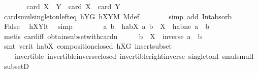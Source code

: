 \begin{isabellebody}
\ \ \ \ \isamarkupfalse%
\ \isamarkupfalse%
\ {\isachardoublequoteopen}card\ {\isacharparenleft}{\kern0pt}X\ {\isasymcdots}\ Y{\isacharparenright}{\kern0pt}\ {\isacharequal}{\kern0pt}\ card\ X\ {\isacharplus}{\kern0pt}\ card\ Y\ {\isacharminus}{\kern0pt}\ {}{\isachardoublequoteclose}\ \isamarkupfalse%
\ card{\isacharunderscore}{\kern0pt}smul{\isacharunderscore}{\kern0pt}singleton{\isacharunderscore}{\kern0pt}left{\isacharunderscore}{\kern0pt}eq\ hYG\ hXYM\ M{\isacharunderscore}{\kern0pt}def\isanewline
\ \ \ \ \ \ \isamarkupfalse%
\ {\isacharparenleft}{\kern0pt}simp\ add{\isacharcolon}{\kern0pt}\ Int{\isacharunderscore}{\kern0pt}absorb{}{\isacharparenright}{\kern0pt}\isanewline
\ \ \ \ \isamarkupfalse%
\ \isamarkupfalse%
\ False\ \isamarkupfalse%
\ hXYlt\ \isamarkupfalse%
\ simp\isanewline
\ \ \isamarkupfalse%
\isanewline
\ \ \isamarkupfalse%
\ \isamarkupfalse%
\ a\ b\ \ habX{\isacharcolon}{\kern0pt}\ {\isachardoublequoteopen}{\isacharbraceleft}{\kern0pt}a{\isacharcomma}{\kern0pt}\ b{\isacharbraceright}{\kern0pt}\ {\isasymsubseteq}\ X{\isachardoublequoteclose}\ \ habne{\isacharcolon}{\kern0pt}\ {\isachardoublequoteopen}a\ {\isasymnoteq}\ b{\isachardoublequoteclose}\ \isamarkupfalse%
\ {\isacharparenleft}{\kern0pt}metis\ card{\isacharunderscore}{\kern0pt}{}{\isacharunderscore}{\kern0pt}iff\ obtain{\isacharunderscore}{\kern0pt}subset{\isacharunderscore}{\kern0pt}with{\isacharunderscore}{\kern0pt}card{\isacharunderscore}{\kern0pt}n{\isacharparenright}{\kern0pt}\isanewline
\ \ \isamarkupfalse%
\ \isamarkupfalse%
\ {\isachardoublequoteopen}b\ {\isasymin}\ X\ {\isasymcdots}\ {\isacharbraceleft}{\kern0pt}inverse\ a\ {\isasymcdot}\ b{\isacharbraceright}{\kern0pt}{\isachardoublequoteclose}\ \isamarkupfalse%
\ {\isacharparenleft}{\kern0pt}smt\ {\isacharparenleft}{\kern0pt}verit{\isacharparenright}{\kern0pt}\ habX\ composition{\isacharunderscore}{\kern0pt}closed\ hXG\ insert{\isacharunderscore}{\kern0pt}subset\ \isanewline
\ \ \ \ invertible\ invertible{\isacharunderscore}{\kern0pt}inverse{\isacharunderscore}{\kern0pt}closed\ invertible{\isacharunderscore}{\kern0pt}right{\isacharunderscore}{\kern0pt}inverse{}\ singletonI\ smul{\isachardot}{\kern0pt}smulI\ subsetD{\isacharparenright}{\kern0pt}%
\begin{isamarkuptext}%

\end{isamarkuptext}
\end{isabellebody}
